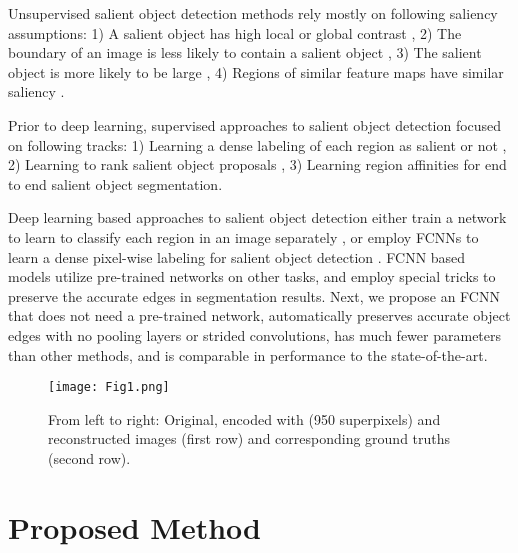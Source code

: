 \documentclass[a4paper,conference]{IEEEtran}
\begin{document}
Unsupervised salient object detection methods rely mostly on following saliency assumptions: 1) A salient object has high local or global contrast \cite{Cheng1,Aytekin1}, 2) The boundary of an image is less likely to contain a salient object \cite{Li2,Aytekin2}, 3) The salient object is more likely to be large \cite{Aytekin2}, 4) Regions of similar feature maps have similar saliency \cite{Aytekin3}. 

Prior to deep learning, supervised approaches to salient object detection focused on following tracks: 1) Learning a dense labeling of each region as salient or not \cite{Jiang, Li3}, 2) Learning to rank salient object proposals \cite{Aytekin4}, 3) Learning region affinities for \cite{Aytekin5} end to end salient object segmentation.

Deep learning based approaches to salient object detection either train a network to learn to classify each region in an image separately \cite{Zhao, Li4,Gayoung}, or employ FCNNs to learn a dense pixel-wise labeling for salient object detection \cite{Wang,Li5}. FCNN based models utilize pre-trained networks on other tasks, and employ special tricks to preserve the accurate edges in segmentation results. Next, we propose an FCNN that does not need a pre-trained network, automatically preserves accurate object edges with no pooling layers or strided convolutions, has much fewer parameters than other methods, and is comparable in performance to the state-of-the-art.

\begin{figure}[!t]
\centering
\texttt{[image: Fig1.png]}
\caption{From left to right: Original, encoded with \cite{Fu} (950 superpixels) and reconstructed images (first row) and corresponding ground truths (second row).}
\label{fig1}
\end{figure}

\section{Proposed Method} \label{PropMet}
\end{document}
